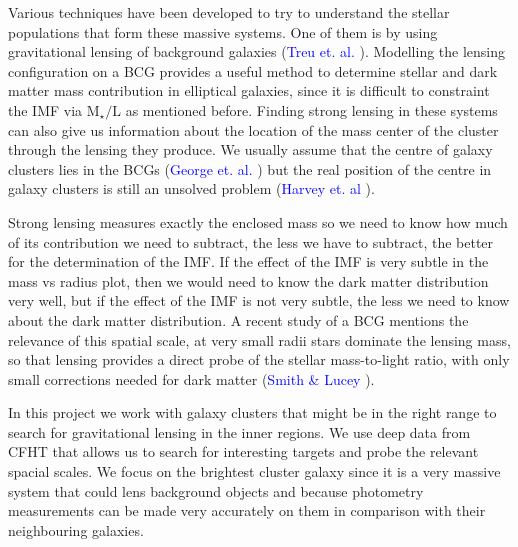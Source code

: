 Various techniques have been developed to try to understand the stellar populations that form these massive systems. One of them is by using gravitational lensing  of  background galaxies (\textcolor{blue}{Treu et. al.} \citeyear{Reference1}). Modelling the lensing configuration on a BCG provides a useful method to determine stellar and dark matter mass contribution in elliptical galaxies, since it is difficult to constraint the IMF via $\textrm{M}_{\star}/\text{L}$ as mentioned before. Finding strong lensing in these systems can also give us information about the location of the mass center of the cluster through the lensing they produce. We usually assume that the centre of galaxy clusters lies in the BCGs (\textcolor{blue}{George et. al.} \citeyear{Reference18}) but the real position of the centre in galaxy clusters is still an unsolved problem (\textcolor{blue}{Harvey et. al} \citeyear{Reference13}). 

Strong lensing measures exactly the enclosed mass so we need to know how much of its contribution we need to subtract, the less we have to subtract, the better for the determination of the IMF. If the effect of the IMF is very subtle in the mass vs radius plot, then we would need to know the dark matter distribution very well, but if the effect of the IMF is not very subtle, the less we need to know about the dark matter distribution. A recent study of a BCG mentions the relevance of this spatial scale, at very small radii stars dominate the lensing mass, so that lensing provides a direct probe of the stellar mass-to-light ratio, with only small corrections needed for dark matter (\textcolor{blue}{Smith \& Lucey} \citeyear{Reference7}). 

In this project we work with galaxy clusters that might be in the right range to search for gravitational lensing in the inner regions. We use deep data from CFHT that allows us to search for interesting targets and probe the relevant spacial scales. We focus on the brightest cluster galaxy since it is a very massive system that could lens background objects and because photometry measurements can be made very accurately on them in comparison with their neighbouring galaxies. 

